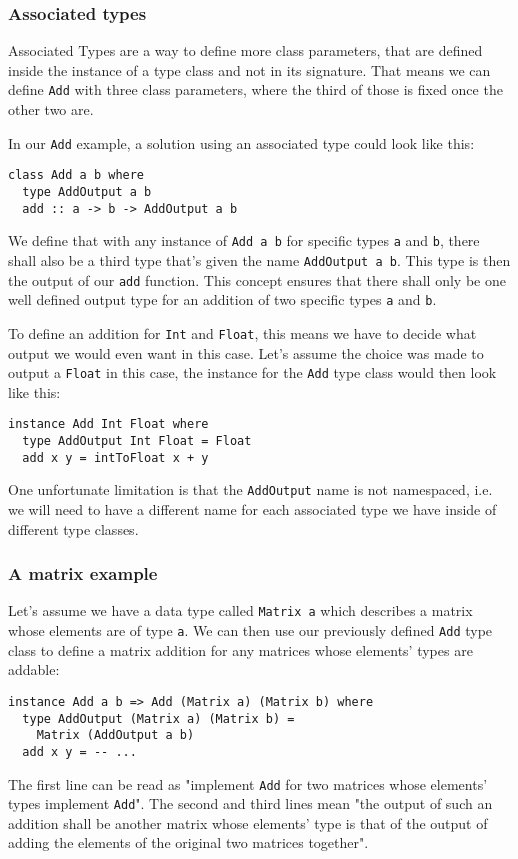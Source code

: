 
\subsubsection{Associated types}


Associated Types are a way to define more class parameters, that are defined inside the instance of a type class and not in its signature. That means we can define \verb|Add| with three class parameters, where the third of those is fixed once the other two are.

In our \verb|Add| example, a solution using an associated type could look like this:
\begin{verbatim}
class Add a b where
  type AddOutput a b
  add :: a -> b -> AddOutput a b
\end{verbatim}
We define that with any instance of \verb|Add a b| for specific types \verb|a| and \verb|b|, there shall also be a third type that's given the name \verb|AddOutput a b|. This type is then the output of our \verb|add| function. This concept ensures that there shall only be one well defined output type for an addition of two specific types \verb|a| and \verb|b|.

To define an addition for \verb|Int| and \verb|Float|, this means we have to decide what output we would even want in this case. Let's assume the choice was made to output a \verb|Float| in this case, the instance for the \verb|Add| type class would then look like this:
\begin{verbatim}
instance Add Int Float where
  type AddOutput Int Float = Float
  add x y = intToFloat x + y
\end{verbatim}
One unfortunate limitation is that the \verb|AddOutput| name is not namespaced, i.e. we will need to have a different name for each associated type we have inside of different type classes.

\subsubsection{A matrix example}\label{haskell-matrix}

Let's assume we have a data type called \verb|Matrix a| which describes a matrix whose elements are of type \verb|a|. We can then use our previously defined \verb|Add| type class to define a matrix addition for any matrices whose elements' types are addable:
\begin{verbatim}
instance Add a b => Add (Matrix a) (Matrix b) where
  type AddOutput (Matrix a) (Matrix b) =
    Matrix (AddOutput a b)
  add x y = -- ...
\end{verbatim}
The first line can be read as "implement \verb|Add| for two matrices whose elements' types implement \verb|Add|". The second and third lines mean "the output of such an addition shall be another matrix whose elements' type is that of the output of adding the elements of the original two matrices together".

